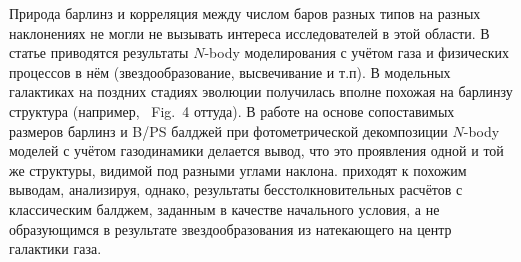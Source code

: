 \documentclass{trlnotes}
\begin{document}
Природа барлинз и корреляция между числом баров разных типов на разных наклонениях не могли не вызывать интереса исследователей в этой области.
В статье \citet{athanassoula2013a} приводятся результаты $N$-body моделирования с учётом газа и физических процессов в нём (звездообразование,
высвечивание и т.п). В модельных галактиках на поздних стадиях эволюции  получилась вполне похожая на барлинзу структура (например, ~Fig.~4
оттуда). В работе  \citet{athanassoula2015} на основе сопоставимых размеров барлинз и B/PS балджей при фотометрической декомпозиции $N$-body
моделей с учётом газодинамики делается вывод, что это проявления одной и той же структуры, видимой под разными углами наклона. \citet{salo2017} приходят к похожим выводам, анализируя, однако, результаты бесстолкновительных расчётов с классическим балджем, заданным
в качестве начального условия, а не образующимся в результате звездообразования из  натекающего на центр галактики газа. 
\end{document}
